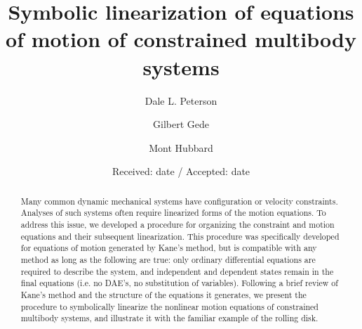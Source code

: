\documentclass[smallcondensed,final]{svjour3}                     %
\begin{document}
\title{Symbolic linearization of equations of motion of constrained multibody systems}


\author{Dale L. Peterson\and Gilbert Gede\and Mont Hubbard}


\date{Received: date / Accepted: date}

\maketitle

\begin{abstract}
Many common dynamic mechanical systems have configuration or velocity constraints.
Analyses of such systems often require linearized forms of the motion
equations.
To address this issue, we developed a procedure for organizing the constraint
and motion equations and their subsequent linearization.  This procedure was
specifically developed for equations of motion generated by Kane's method, but
is compatible with any method as long as the following are true: only ordinary
differential equations are required to describe the system, and independent and
dependent states remain in the final equations (i.e. no DAE's, no substitution
of variables).
Following a brief review of Kane's method and the structure of the equations it
generates, we present the procedure to symbolically linearize the nonlinear
motion equations of constrained multibody systems, and illustrate it with the
familiar example of the rolling disk.

\end{abstract}
\end{document}
